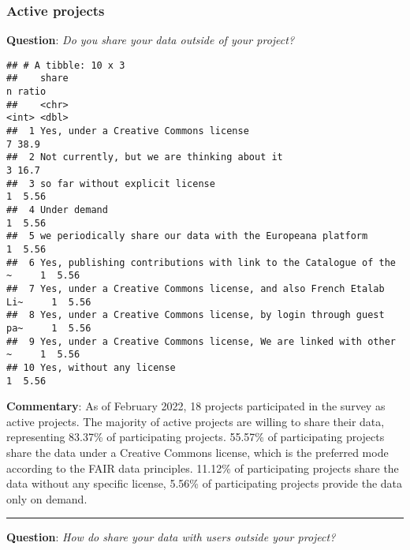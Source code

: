 \documentclass[
]{article}
\begin{document}
\hypertarget{active-projects}{%
\subsubsection{Active projects}\label{active-projects}}

\textbf{Question}: \emph{Do you share your data outside of your
project?}

\begin{verbatim}
## # A tibble: 10 x 3
##    share                                                                 n ratio
##    <chr>                                                             <int> <dbl>
##  1 Yes, under a Creative Commons license                                 7 38.9 
##  2 Not currently, but we are thinking about it                           3 16.7 
##  3 so far without explicit license                                       1  5.56
##  4 Under demand                                                          1  5.56
##  5 we periodically share our data with the Europeana platform            1  5.56
##  6 Yes, publishing contributions with link to the Catalogue of the ~     1  5.56
##  7 Yes, under a Creative Commons license, and also French Etalab Li~     1  5.56
##  8 Yes, under a Creative Commons license, by login through guest pa~     1  5.56
##  9 Yes, under a Creative Commons license, We are linked with other ~     1  5.56
## 10 Yes, without any license                                              1  5.56
\end{verbatim}

\textbf{Commentary}: As of February 2022, 18 projects participated in
the survey as active projects. The majority of active projects are
willing to share their data, representing 83.37\% of participating
projects. 55.57\% of participating projects share the data under a
Creative Commons license, which is the preferred mode according to the
FAIR data principles. 11.12\% of participating projects share the data
without any specific license, 5.56\% of participating projects provide
the data only on demand.

\begin{center}\rule{0.5\linewidth}{0.5pt}\end{center}

\textbf{Question}: \emph{How do share your data with users outside your
project?}
\end{document}
